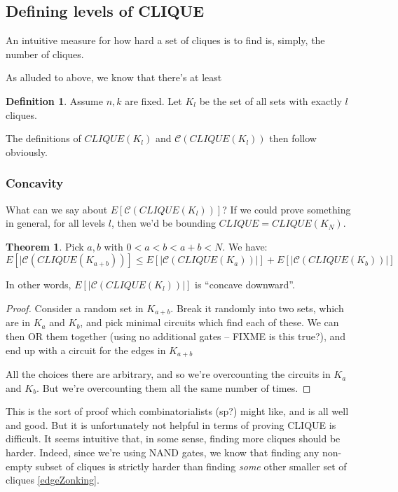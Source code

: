 \documentclass[12pt]{article}
\theoremstyle{definition}
\newtheorem{thm}{Theorem}[section]
\newtheorem{defn}{Definition}[section]
\newcommand{\bigC}[0]{\mathcal{C}}
\begin{document}
\subsection{Defining levels of CLIQUE}

An intuitive measure for how hard a set of cliques
is to find is, simply, the number of cliques.

As alluded to above, we know that there's at least 


\begin{defn}
\label{CLIQUE-level}
Assume $n, k$ are fixed. Let $K_l$ be the set of all sets
with exactly $l$ cliques. 
\end{defn}

The definitions of $CLIQUE(K_l)$ and $\bigC(CLIQUE(K_l))$ then
follow obviously.

\subsubsection{Concavity}

What can we say about $E[\bigC(CLIQUE(K_l))]$? If we could
prove something in general, for all levels $l$, then we'd be bounding
$CLIQUE = CLIQUE(K_N)$.


\begin{thm}
\label{concavity}
Pick $a, b$ with $0 < a < b < a+b < N$. We have:
\[
E[|\bigC(CLIQUE(K_{a+b}))] \le
E[|\bigC(CLIQUE(K_a))|] + E[|\bigC(CLIQUE(K_b))|]
\]

In other words, $E[|\bigC(CLIQUE(K_l))|]$ is ``concave downward''.
\end{thm}
\begin{proof}
Consider a random set in $K_{a+b}$. Break it randomly into
two sets, which are in $K_a$ and $K_b$, and pick minimal
circuits which find each of these. We can then OR them together
(using no additional gates -- FIXME is this true?), and end up
with a circuit for the edges in $K_{a+b}$

All the choices there are arbitrary, and so we're overcounting
the circuits in $K_a$ and $K_b$. But we're overcounting them all
the same number of times.
\end{proof}

This is the sort of proof which combinatorialists (sp?)
might like, and is all well and good. But
it is unfortunately not helpful in
terms of proving CLIQUE is difficult.
It seems intuitive that, in some sense, finding more cliques should
be harder.
Indeed, since we're using NAND gates, we know that finding any non-empty
subset of cliques is strictly harder than finding {\em some} other 
smaller set of cliques \ref{edgeZonking}.
\end{document}
